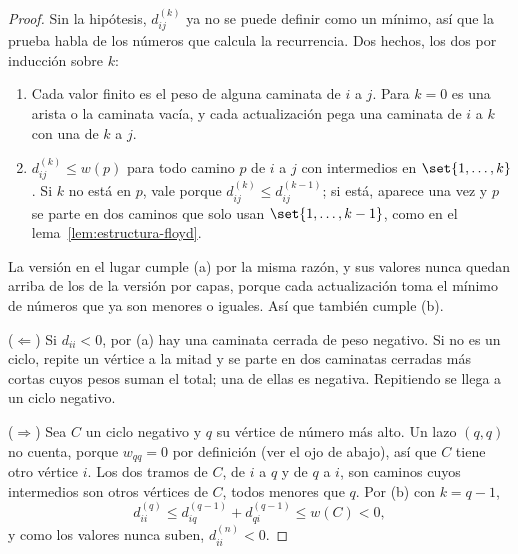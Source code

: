 \documentclass[11pt,letterpaper]{article}
\begin{document}
\begin{proof}
  Sin la hipótesis, $d^{(k)}_{ij}$ ya no se puede definir como un
  mínimo, así que la prueba habla de los números que calcula la
  recurrencia. Dos hechos, los dos por inducción sobre $k$:
  \begin{enumerate}[label=(\alph*), itemsep=0.1em]
    \item Cada valor finito es el peso de alguna caminata de $i$ a $j$.
          Para $k = 0$ es una arista o la caminata vacía, y cada
          actualización pega una caminata de $i$ a $k$ con una de $k$
          a $j$.
    \item $d^{(k)}_{ij} \le w(p)$ para todo camino $p$ de $i$ a $j$
          con intermedios en $\set{1, \dots, k}$. Si $k$ no está en
          $p$, vale porque $d^{(k)}_{ij} \le d^{(k-1)}_{ij}$; si está,
          aparece una vez y $p$ se parte en dos caminos que solo usan
          $\set{1, \dots, k - 1}$, como en el
          lema~\ref{lem:estructura-floyd}.
  \end{enumerate}
  La versión en el lugar cumple (a) por la misma razón, y sus valores
  nunca quedan arriba de los de la versión por capas, porque cada
  actualización toma el mínimo de números que ya son menores o
  iguales. Así que también cumple (b).

  ($\Leftarrow$) Si $d_{ii} < 0$, por (a) hay una caminata cerrada de
  peso negativo. Si no es un ciclo, repite un vértice a la mitad y se
  parte en dos caminatas cerradas más cortas cuyos pesos suman el
  total; una de ellas es negativa. Repitiendo se llega a un ciclo
  negativo.

  ($\Rightarrow$) Sea $C$ un ciclo negativo y $q$ su vértice de número
  más alto. Un lazo $(q, q)$ no cuenta, porque $w_{qq} = 0$ por
  definición (ver el ojo de abajo), así que $C$ tiene otro vértice
  $i$. Los dos tramos de $C$, de $i$ a $q$ y de $q$ a $i$, son caminos
  cuyos intermedios son otros vértices de $C$, todos menores que $q$.
  Por (b) con $k = q - 1$,
  \[
    d^{(q)}_{ii} \le d^{(q-1)}_{iq} + d^{(q-1)}_{qi} \le w(C) < 0 ,
  \]
  y como los valores nunca suben, $d^{(n)}_{ii} < 0$.
\end{proof}
\end{document}
